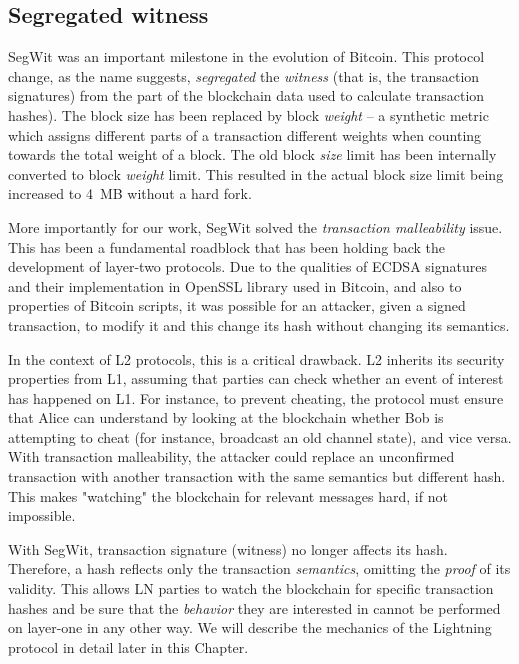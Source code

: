 \subsection{Segregated witness}

SegWit was an important milestone in the evolution of Bitcoin.
This protocol change, as the name suggests, \textit{segregated} the \textit{witness} (that is, the transaction signatures) from the part of the blockchain data used to calculate transaction hashes).
The block size has been replaced by block \textit{weight} -- a synthetic metric which assigns different parts of a transaction different weights when counting towards the total weight of a block.
The old block \textit{size} limit has been internally converted to block \textit{weight} limit.
This resulted in the actual block size limit being increased to 4~MB without a hard fork.

More importantly for our work, SegWit solved the \textit{transaction malleability} issue.
This has been a fundamental roadblock that has been holding back the development of layer-two protocols.
Due to the qualities of ECDSA signatures and their implementation in OpenSSL library used in Bitcoin, and also to properties of Bitcoin scripts, it was possible for an attacker, given a signed transaction, to modify it and this change its hash without changing its semantics.

In the context of L2 protocols, this is a critical drawback.
L2 inherits its security properties from L1, assuming that parties can check whether an event of interest has happened on L1.
For instance, to prevent cheating, the protocol must ensure that Alice can understand by looking at the blockchain whether Bob is attempting to cheat (for instance, broadcast an old channel state), and vice versa.
With transaction malleability, the attacker could replace an unconfirmed transaction with another transaction with the same semantics but different hash.
This makes "watching" the blockchain for relevant messages hard, if not impossible.

With SegWit, transaction signature (witness) no longer affects its hash.
Therefore, a hash reflects only the transaction \textit{semantics}, omitting the \textit{proof} of its validity.
This allows LN parties to watch the blockchain for specific transaction hashes and be sure that the \textit{behavior} they are interested in cannot be performed on layer-one in any other way.
We will describe the mechanics of the Lightning protocol in detail later in this Chapter.


